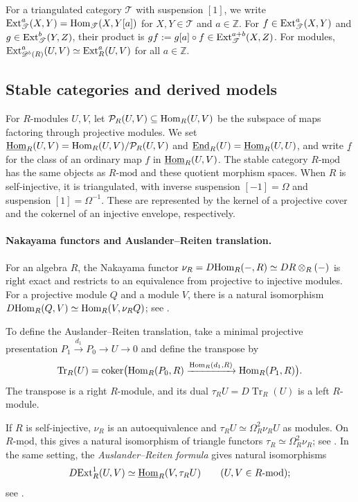 \documentclass[11pt]{article}
\begin{document}
For a triangulated category $\mathscr T$ with suspension $[1]$, we write
${\rm Ext}_{\mathscr T}^a(X,Y)={\rm Hom}_{\mathscr T}(X,Y[a])$ for $X, Y\in\mathscr{T}$ and $a\in\mathbb Z$.
For $f\in{\rm Ext}_{\mathscr T}^a(X,Y)$ and
$g\in{\rm Ext}_{\mathscr T}^b(Y,Z)$, their product is
$gf:=g[a]\circ f\in{\rm Ext}_{\mathscr T}^{a+b}(X,Z)$.
For modules, ${\rm Ext}_{\mathscr D^b(R)}^a(U,V)\simeq{\rm Ext}_R^a(U,V)$
for all $a\in\mathbb Z$.


\subsection{Stable categories and derived models}\label{prelim:stable}

For $R$-modules $U,V$, let $\mathcal P_R(U,V)\subseteq{\rm Hom}_R(U,V)$ be the
subspace of maps factoring through projective modules. We set
$\underline{{\rm Hom}}_R(U,V)={\rm Hom}_R(U,V)/\mathcal P_R(U,V)$ and
$\underline{{\rm End}}_R(U)=\underline{{\rm Hom}}_R(U,U)$, and write
$\underline f$ for the class of an ordinary map $f$ in $\underline{{\rm Hom}}_R(U,V)$.
The stable category $R\text{-}\underline{\mathrm{mod}}$ has the same
objects as $R\text{-}\mathrm{mod}$ and these quotient morphism spaces.
When $R$ is self-injective, it is triangulated, with inverse
suspension $[-1]=\Omega$ and suspension $[1]=\Omega^{-1}$.
These are represented by the kernel of a projective
cover and the cokernel of an injective envelope, respectively.

\paragraph{Nakayama functors and Auslander--Reiten translation.}
\label{prelim:AR-duality}

For an algebra $R$, the Nakayama functor
$\nu_R=D{\rm Hom}_R(-,R)\simeq DR\otimes_R(-)$ is right exact and
restricts to an equivalence from projective to injective modules.
For a projective module $Q$ and a module $V$, there is a natural isomorphism
$D{\rm Hom}_R(Q,V)\simeq{\rm Hom}_R(V,\nu_RQ)$;
see \cite[Section~6.4 and Lemma~6.4.5]{KrauseHTR}.

To define the Auslander--Reiten translation, take a minimal projective
presentation $P_1\xrightarrow{d_1}P_0\to U\to0$ and define the transpose by
\[
 \operatorname{Tr}_R(U)=\operatorname{coker}\bigl({\rm Hom}_R(P_0,R)
       \xrightarrow{{\rm Hom}_R(d_1,R)}{\rm Hom}_R(P_1,R)\bigr).
\]
The transpose is a right $R$-module, and its dual
$\tau_RU=D\operatorname{Tr}_R(U)$ is a left $R$-module.

If $R$ is self-injective, $\nu_R$ is an autoequivalence and
$\tau_RU\simeq\Omega_R^2\nu_RU$ as modules. On
$R\text{-}\underline{\mathrm{mod}}$, this gives a natural isomorphism
of triangle functors $\tau_R\simeq\Omega_R^2\nu_R$;
see \cite[Proposition~IV.3.7(a)]{ARS}.
In the same setting, the \emph{Auslander--Reiten formula} gives natural isomorphisms
\[
 D{\rm Ext}_R^1(U,V)\simeq\underline{{\rm Hom}}_R(V,\tau_RU)
 \qquad(U,V\in R\text{-}\mathrm{mod});
\]
see \cite[Proposition~6.3.5]{KrauseHTR}.
\end{document}
